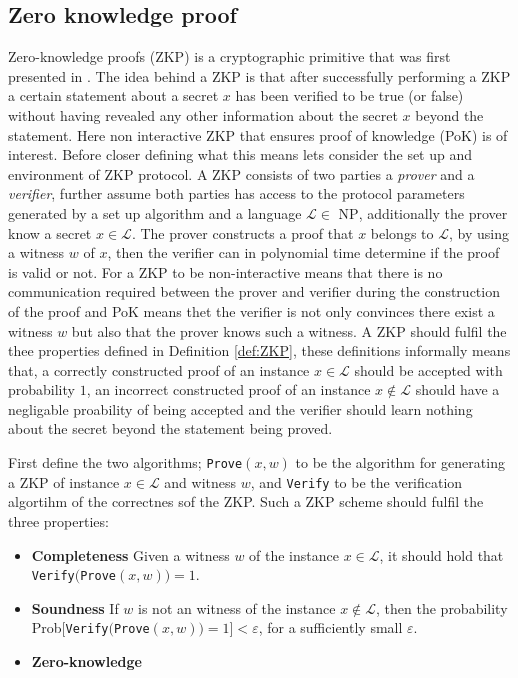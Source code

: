 \subsection*{Zero knowledge proof}
Zero-knowledge proofs (ZKP) is a cryptographic primitive that was first presented in \cite{OG_ZKP}. The idea behind a ZKP is that after successfully performing a ZKP a certain statement about a secret $x$ has been verified to be true (or false) without having revealed any other information about the secret $x$ beyond the statement. Here non interactive ZKP that ensures proof of knowledge (PoK) is of interest. Before closer defining what this means lets consider the set up and environment of ZKP protocol. A ZKP consists of two parties a \textit{prover} and a \textit{verifier}, further assume both parties has access to the protocol parameters generated by a set up algorithm and a language $\mathcal{L}\in \text{ NP}$, additionally the prover know a secret $x\in \mathcal{L}$. The prover constructs a proof that $x$ belongs to $\mathcal{L}$, by using a witness $w$ of $x$, then the verifier can in polynomial time determine if the proof is valid or not. 
For a ZKP to be non-interactive means that there is no communication required between the prover and verifier during the construction of the proof and PoK means thet the verifier is not only convinces there exist a witness $w$ but also that the prover knows such a witness. A ZKP should fulfil the thee properties defined in Definition \ref{def:ZKP}, these definitions informally means that, a correctly constructed proof of an instance $x\in\mathcal{L}$ should be accepted with probability $1$, an incorrect constructed proof of an instance $x\notin\mathcal{L}$ should have a negligable proability of being accepted and the verifier should learn nothing about the secret beyond the statement being proved.
 

\begin{Mydef}
\label{def:ZKP}
First define the two algorithms;  \texttt{Prove}$(x,w)$ to be the algorithm for generating a ZKP of instance $x\in\mathcal{L}$ and witness $w$, and  \texttt{Verify} to be the verification algortihm of the correctnes sof the ZKP. Such a ZKP scheme  should fulfil the three properties: 
\begin{itemize}
\item \textbf{Completeness} Given a witness $w$ of the instance $x\in\mathcal{L}$, it should hold that \texttt{Verify}$($\texttt{Prove}$(x,w)) = 1$. 
\item \textbf{Soundness} If $w$ is not an witness of the instance $x\notin\mathcal{L}$, then the probability  Prob$[$\texttt{Verify}$($\texttt{Prove}$(x,w)) = 1] < \varepsilon$, for a sufficiently small $\varepsilon$. 
\item  \textbf{Zero-knowledge} %
\end{itemize}
\end{Mydef}
 
